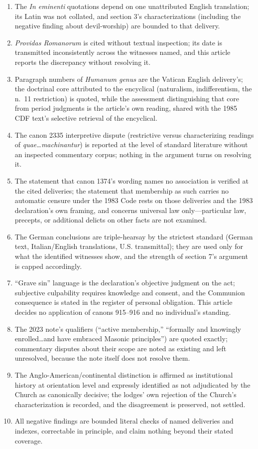 \begin{enumerate}[leftmargin=1.45em,itemsep=0.25em]
\item The \emph{In eminenti} quotations depend on one unattributed English translation; its Latin was not collated, and section 3's characterizations (including the negative finding about devil-worship) are bounded to that delivery.
\item \emph{Providas Romanorum} is cited without textual inspection; its date is transmitted inconsistently across the witnesses named, and this article reports the discrepancy without resolving it.
\item Paragraph numbers of \emph{Humanum genus} are the Vatican English delivery's; the doctrinal core attributed to the encyclical (naturalism, indifferentism, the n.~11 restriction) is quoted, while the assessment distinguishing that core from period judgments is the article's own reading, shared with the 1985 CDF text's selective retrieval of the encyclical.
\item The canon 2335 interpretive dispute (restrictive versus characterizing readings of \emph{quae\ldots machinantur}) is reported at the level of standard literature without an inspected commentary corpus; nothing in the argument turns on resolving it.
\item The statement that canon 1374's wording names no association is verified at the cited deliveries; the statement that membership as such carries no automatic censure under the 1983 Code rests on those deliveries and the 1983 declaration's own framing, and concerns universal law only---particular law, precepts, or additional delicts on other facts are not examined.
\item The German conclusions are triple-hearsay by the strictest standard (German text, Italian/English translations, U.S. transmittal); they are used only for what the identified witnesses show, and the strength of section 7's argument is capped accordingly.
\item ``Grave sin'' language is the declaration's objective judgment on the act; subjective culpability requires knowledge and consent, and the Communion consequence is stated in the register of personal obligation. This article decides no application of canons 915--916 and no individual's standing.
\item The 2023 note's qualifiers (``active membership,'' ``formally and knowingly enrolled\ldots and have embraced Masonic principles'') are quoted exactly; commentary disputes about their scope are noted as existing and left unresolved, because the note itself does not resolve them.
\item The Anglo-American/continental distinction is affirmed as institutional history at orientation level and expressly identified as not adjudicated by the Church as canonically decisive; the lodges' own rejection of the Church's characterization is recorded, and the disagreement is preserved, not settled.
\item All negative findings are bounded literal checks of named deliveries and indexes, correctable in principle, and claim nothing beyond their stated coverage.
\end{enumerate}

